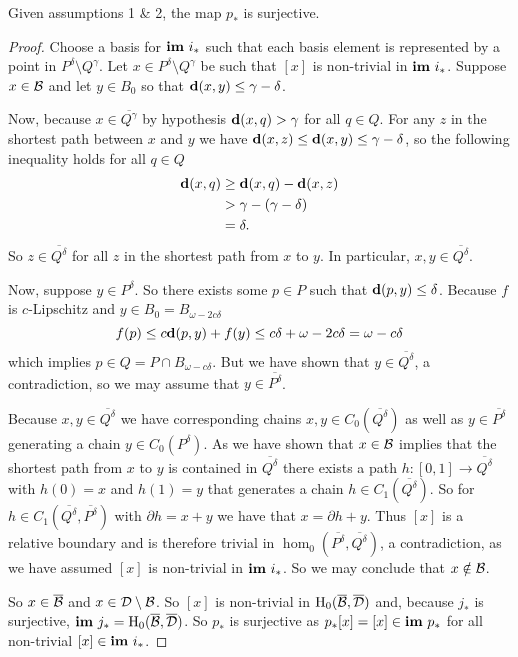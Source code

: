 \begin{lemma}\label{lem:psurj}
    Given assumptions 1 \& 2, the map $p_*$ is surjective.
\end{lemma}
\begin{proof}
  Choose a basis for $\mathbf{im}~i_*$ such that each basis element is represented by a point in $P^\delta\setminus Q^\gamma$.
  Let $x\in P^\delta\setminus Q^\gamma$ be such that $[x]$ is non-trivial in $\mathbf{im}~i_*$.
  Suppose $x\in{\mathcal{B}}$ and let $y\in B_0$ so that $\mathbf{d}(x, y)\leq \gamma-\delta$.

  Now, because $x\in\overline{Q^\gamma}$ by hypothesis $\mathbf{d}(x, q) > \gamma$ for all $q\in Q$.
  For any $z$ in the shortest path between $x$ and $y$ we have $\mathbf{d}(x, z)\leq \mathbf{d}(x, y)\leq \gamma-\delta$, so the following inequality holds for all $q\in Q$
  \begin{align*}
    \mathbf{d}(x, q) & \geq \mathbf{d}(x, q) - \mathbf{d}(x, z)\\
                & > \gamma - (\gamma - \delta)\\
                & = \delta.
  \end{align*}
  So $z\in \overline{Q^\delta}$ for all $z$ in the shortest path from $x$ to $y$.
  In particular, $x,y\in\overline{Q^\delta}$.

  Now, suppose $y\in P^\delta$.
  So there exists some $p\in P$ such that $\mathbf{d}(p, y)\leq \delta$.
  Because $f$ is $c$-Lipschitz and $y\in B_0 = B_{\omega - 2c\delta}$
  \[ f(p)\leq c\mathbf{d}(p, y) + f(y)\leq c\delta + \omega - 2c\delta = \omega - c\delta \]
  which implies $p\in Q = P\cap B_{\omega-c\delta}$.
  But we have shown that $y\in \overline{Q^\delta}$, a contradiction, so we may assume that $y\in \overline{P^\delta}$.

  Because $x,y\in\overline{Q^\delta}$ we have corresponding chains $x,y\in C_0(\overline{Q^\delta})$ as well as $y\in\overline{P^\delta}$ generating a chain $y\in C_0(P^\delta)$.
  As we have shown that $x\in {\mathcal{B}}$ implies that the shortest path from $x$ to $y$ is contained in $\overline{Q^\delta}$ there exists a path $h: [0,1]\to \overline{Q^\delta}$ with $h(0) = x$ and $h(1) = y$ that generates a chain $h\in C_1(\overline{Q^\delta})$.
  So for $h\in C_1(\overline{Q^\delta}, \overline{P^\delta})$ with $\partial h = x + y$ we have that $x = \partial h + y$.
  Thus $[x]$ is a relative boundary and is therefore trivial in $\hom_0(\overline{P^\delta}, \overline{Q^\delta})$, a contradiction, as we have assumed $[x]$ is non-trivial in $\mathbf{im}~i_*$.
  So we may conclude that $x\notin {\mathcal{B}}$.

  So $x\in\overline{{\mathcal{B}}}$ and $x\in {\mathcal{D}}\setminus{\mathcal{B}}$.
  So $[x]$ is non-trivial in $\mathrm{H}_0(\overline{{\mathcal{B}}},\overline{{\mathcal{D}}})$ and, because $j_*$ is surjective, $\mathbf{im}~j_* = \mathrm{H}_0(\overline{{\mathcal{B}}},\overline{{\mathcal{D}}})$.
  So $p_*$ is surjective as $p_*[x] = [x]\in\mathbf{im}~p_*$ for all non-trivial $[x]\in\mathbf{im}~i_*$.
\end{proof}

